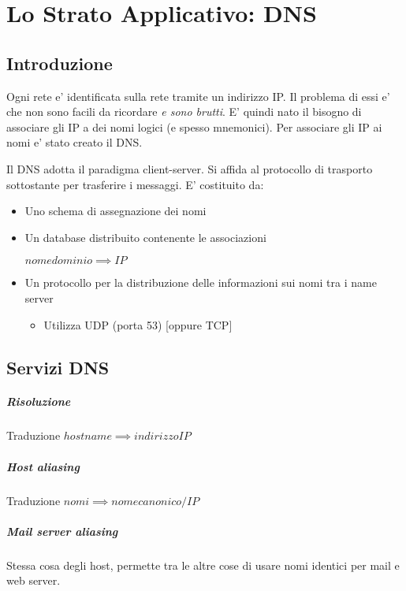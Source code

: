 \chapter{Lo Strato Applicativo: DNS}
\section{Introduzione}

Ogni rete e' identificata sulla rete tramite un indirizzo IP.
Il problema di essi e' che non sono facili da ricordare \textit{\tiny e sono brutti}.
E' quindi nato il bisogno di associare gli IP a dei nomi logici (e spesso mnemonici).
Per associare gli IP ai nomi e' stato creato il DNS.

Il DNS adotta il paradigma client-server.
Si affida al protocollo di trasporto sottostante per trasferire i messaggi.
E' costituito da:
\begin{itemize}
    \item Uno schema di assegnazione dei nomi
    \item Un database distribuito contenente le associazioni 
    \begin{center}
        $nome dominio \implies IP$
    \end{center}
    \item Un protocollo per la distribuzione delle informazioni sui nomi tra i name server
    \begin{itemize}
        \item Utilizza UDP (porta 53) [oppure TCP]
    \end{itemize}
\end{itemize}

\section{Servizi DNS}
\paragraph{Risoluzione} Traduzione $hostname \implies indirizzo IP$
\paragraph{Host aliasing} Traduzione $nomi \implies nome canonico / IP$
\paragraph{Mail server aliasing} Stessa cosa degli host, permette tra le altre cose di usare nomi identici per mail e web server.
